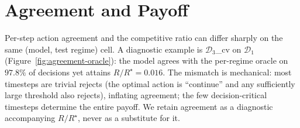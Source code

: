 \documentclass[11pt]{article}
\begin{document}
\begin{table}[H]
\centering
\scriptsize
\setlength{\tabcolsep}{3pt}
\caption{Random-ADP convergence diagnostic. Six training-distribution/test-regime cells. Production $(K_1, K_2, J\,[, J_\sigma]) = (256, 256, 64\,[, 64])$ vs.\ reference $(512, 512, 128\,[, 128])$. Gate: action-label disagreement $< 10^{-3}$.}
\label{tab:convergence-random}
\end{table}

\section{Agreement and Payoff}
\label{sec:res-agreement}

Per-step action agreement and the competitive ratio can differ sharply on the same (model, test regime) cell. A diagnostic example is $\mathcal{D}_3$\_cv on $\mathcal{D}_1$ (Figure~\ref{fig:agreement-oracle}): the model agrees with the per-regime oracle on $97.8\%$ of decisions yet attains $R/R^\star = 0.016$. The mismatch is mechanical: most timesteps are trivial rejects (the optimal action is ``continue'' and any sufficiently large threshold also rejects), inflating agreement; the few decision-critical timesteps determine the entire payoff. We retain agreement as a diagnostic accompanying $R/R^\star$, never as a substitute for it.
\end{document}
